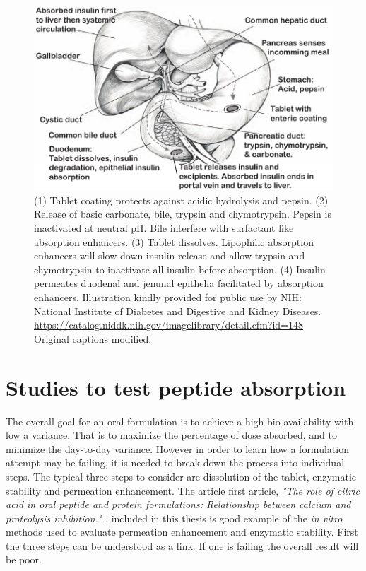 \begin{figure}[ht]

\includegraphics{graphics/intro_anatomy2.pdf}
\caption{(1) Tablet coating protects against acidic hydrolysis and pepsin. (2) Release of basic carbonate, bile, trypsin and chymotrypsin. Pepsin is inactivated at neutral pH. Bile interfere with surfactant like absorption enhancers. (3) Tablet dissolves. Lipophilic absorption enhancers will slow down insulin release and allow trypsin and chymotrypsin to inactivate all insulin before absorption. (4) Insulin permeates duodenal and jenunal epithelia facilitated by absorption enhancers. Illustration kindly provided for public use by NIH: National Institute of Diabetes and Digestive and Kidney Diseases. \url{https://catalog.niddk.nih.gov/imagelibrary/detail.cfm?id=148} Original captions modified.}
\label{intro_glucoseTolerance}
\end{figure}

\section{Studies to test peptide absorption}
The overall goal for an oral formulation is to achieve a high bio-availability with low a variance. That is to maximize the percentage of dose absorbed, and to minimize the day-to-day variance. However in order to learn how a formulation attempt may be failing, it is needed to break down the process into individual steps. The typical three steps to consider are dissolution of the tablet, enzymatic stability and permeation enhancement. The article first article, \textit{"The role of citric acid in oral peptide and protein formulations: Relationship between calcium and proteolysis inhibition."} \cite{welling2014citric}, included in this thesis is good example of the \textit{in vitro} methods used to evaluate permeation enhancement and enzymatic stability. First the three steps can be understood as a link. If one is failing the overall result will be poor.

